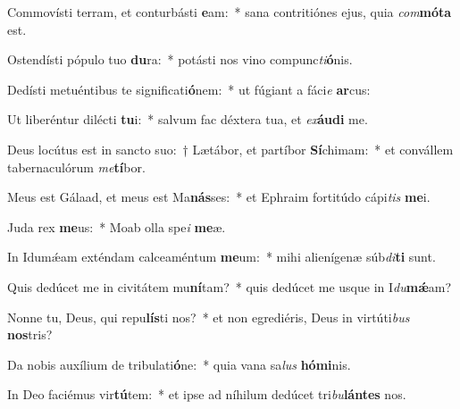 \item Commovísti terram, et conturbásti \textbf{e}am:~* sana contritiónes ejus, quia \textit{com}\textbf{mó}\textbf{ta} est.
\item Ostendísti pópulo tuo \textbf{du}ra:~* potásti nos vino compunc\textit{ti}\textbf{ó}nis.
\item Dedísti metuéntibus te significati\textbf{ó}nem:~* ut fúgiant a fáci\textit{e} \textbf{ar}cus:
\item Ut liberéntur dilécti \textbf{tu}i:~* salvum fac déxtera tua, et \textit{ex}\textbf{áu}\textbf{di} me.
\item Deus locútus est in sancto suo:~† Lætábor, et partíbor \textbf{Sí}chimam:~* et convállem tabernaculórum \textit{me}\textbf{tí}bor.
\item Meus est Gálaad, et meus est Ma\textbf{nás}ses:~* et Ephraim fortitúdo cápi\textit{tis} \textbf{me}i.
\item Juda rex \textbf{me}us:~* Moab olla spe\textit{i} \textbf{me}æ.
\item In Idumǽam exténdam calceaméntum \textbf{me}um:~* mihi alienígenæ súb\textit{di}\textbf{ti} sunt.
\item Quis dedúcet me in civitátem mu\textbf{ní}tam?~* quis dedúcet me usque in I\textit{du}\textbf{mǽ}am?
\item Nonne tu, Deus, qui repu\textbf{lís}ti nos?~* et non egrediéris, Deus in virtúti\textit{bus} \textbf{nos}tris?
\item Da nobis auxílium de tribulati\textbf{ó}ne:~* quia vana sa\textit{lus} \textbf{hó}\textbf{mi}nis.
\item In Deo faciémus vir\textbf{tú}tem:~* et ipse ad níhilum dedúcet tri\textit{bu}\textbf{lán}\textbf{tes} nos.
